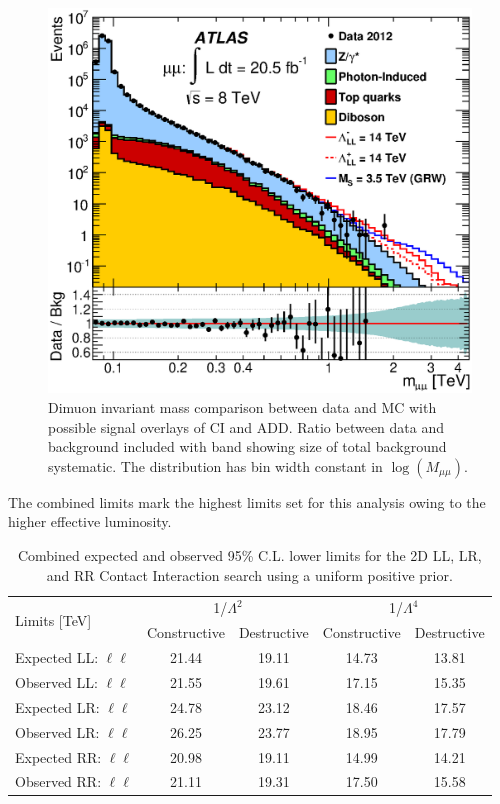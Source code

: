    \begin{figure}[h]
        \begin{center}
            \includegraphics[width=0.8\linewidth]{images/fig_01b.eps}
        \end{center}
       \caption{Dimuon invariant mass comparison between data and MC with possible signal overlays of CI and ADD. Ratio between data and background included with band showing size of total background systematic. The distribution has bin width constant in $\log(M_{\mu\mu})$.}
       \label{fig:invMass_muon}
    \end{figure}


    The combined limits mark the highest limits set for this analysis owing to the higher effective luminosity. 


\begin{table}[p]
\centering
\begin{tabular}{ l|c|c|c|c }
    \hline
    \hline
    \multirow{2}{*}{Limits [TeV]} & \multicolumn{2}{c|}{1/$\Lambda^2$} & \multicolumn{2}{c}{1/$\Lambda^4$} \\
    \cline{2-5}
     & Constructive & Destructive & Constructive & Destructive \\
    \hline
    Expected LL: $\ell\ell$ & 21.44 & 19.11 & 14.73 & 13.81 \\
    Observed LL: $\ell\ell$  & 21.55 & 19.61 & 17.15 & 15.35 \\
    \hline
    Expected LR: $\ell\ell$ & 24.78 & 23.12 & 18.46 & 17.57 \\
    Observed LR: $\ell\ell$ & 26.25 & 23.77 & 18.95 & 17.79 \\
    \hline
    Expected RR: $\ell\ell$ & 20.98 & 19.11 & 14.99 & 14.21 \\
    Observed RR: $\ell\ell$ & 21.11 & 19.31 & 17.50 & 15.58 \\
    \hline
    \hline
\end{tabular}
\caption{Combined expected and observed 95\% C.L. lower limits for the 2D LL, LR, and RR Contact Interaction search using a uniform positive prior.}
\label{tab:Comb_Limits_CI}
\end{table}


